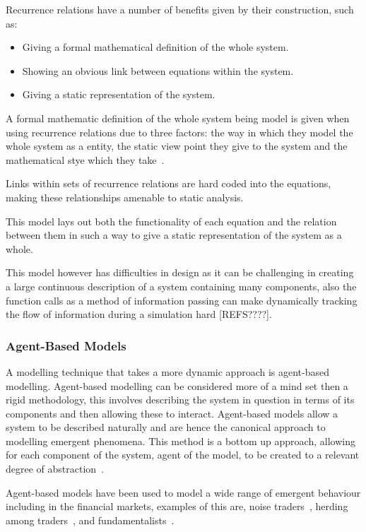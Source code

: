 \documentclass{article}
\begin{document}
Recurrence relations have a number of benefits given by their construction, such as:
\begin{itemize}
    \item Giving a formal mathematical definition of the whole system.
    \item Showing an obvious link between equations within the system.
    \item Giving a static representation of the system.
\end{itemize}

A formal mathematic definition of the whole system being model is given when using recurrence relations due to three factors: the way in which they model the whole system as a entity, the static view point they give to the system and the mathematical stye which they take~\cite{rrformulism}.  %

Links within sets of recurrence relations are hard coded into the equations, making these relationships amenable to static analysis.      

This model lays out both the functionality of each equation and the relation between them in such a way to give a static representation of the system as a whole. 

This model however has difficulties in design as it can be challenging in creating a large continuous description of a system containing many components, also the function calls as a method of information passing can make dynamically tracking the flow of information during a simulation hard [REFS????].   


\subsubsection{Agent-Based Models}
A modelling technique that takes a more dynamic approach is agent-based modelling. Agent-based modelling can be considered more of a mind set then a rigid methodology, this involves describing the system in question in terms of its components and then allowing these to interact. Agent-based models allow a system to be described naturally and are hence the canonical approach to modelling emergent phenomena. This method is a bottom up approach, allowing for each component of the system, agent of the model, to be created to a relevant degree of abstraction~\cite{abmhumsystems}.

Agent-based models have been used to model a wide range of emergent behaviour including in the financial markets, examples of this are, noise traders~\cite{abmnoisetraders}, herding among traders~\cite{abmherding}, and fundamentalists~\cite{abmfundemetilists}.
\end{document}
